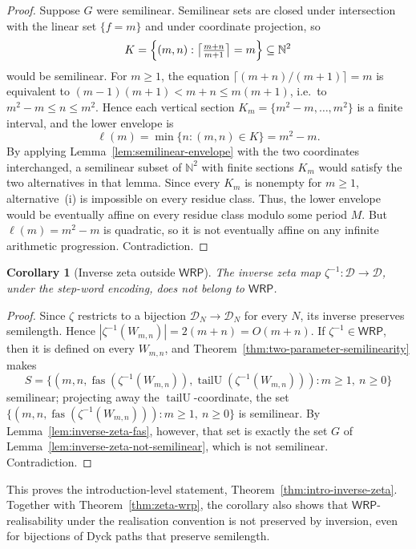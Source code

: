 \documentclass[11pt]{article}
\newtheorem{corollary}[theorem]{Corollary}
\theoremstyle{definition}
\newcommand{\D}{\mathcal D}
\newcommand{\N}{\mathbb N}
\newcommand{\WRP}{\mathsf{WRP}}
\newcommand{\fas}{\operatorname{fas}}
\newcommand{\tailU}{\operatorname{tailU}}
\begin{document}
\begin{proof}
Suppose $G$ were semilinear.  Semilinear sets are closed under intersection
with the linear set $\{f=m\}$ and under coordinate projection, so
\[
   K=\Bigl\{(m,n):\bigl\lceil\tfrac{m+n}{m+1}\bigr\rceil=m\Bigr\}\subseteq\N^2
\]
would be semilinear.  For $m\ge 1$, the equation
$\lceil (m+n)/(m+1)\rceil=m$ is equivalent to
$(m-1)(m+1)<m+n\le m(m+1)$, i.e.\ to $m^2-m\le n\le m^2$.  Hence each
vertical section $K_m=\{m^2-m,\ldots,m^2\}$ is a finite interval, and the
lower envelope is
\[
   \ell(m)=\min\{n:(m,n)\in K\}=m^2-m.
\]
By applying Lemma~\ref{lem:semilinear-envelope} with the two coordinates
interchanged, a semilinear subset of $\N^2$ with finite sections $K_m$ would
satisfy the two alternatives in that lemma.  Since every $K_m$ is nonempty for
$m\ge1$, alternative~(i) is impossible on every residue class.  Thus, the lower
envelope would be eventually affine on every residue class modulo some period
$M$.  But $\ell(m)=m^2-m$ is quadratic, so it is not eventually affine on any
infinite arithmetic progression.  Contradiction.
\end{proof}

\begin{corollary}[Inverse zeta outside $\WRP$]
\label{cor:inverse-zeta-not-wrp}
The inverse zeta map $\zeta^{-1}\colon\D\to\D$, under the step-word
encoding, does not belong to $\WRP$.
\end{corollary}

\begin{proof}
Since $\zeta$ restricts to a bijection $\D_N\to\D_N$ for every $N$, its inverse
preserves semilength.  Hence $|\zeta^{-1}(W_{m,n})|=2(m+n)=O(m+n)$.  If
$\zeta^{-1}\in\WRP$, then it is defined on every $W_{m,n}$, and
Theorem~\ref{thm:two-parameter-semilinearity} makes
\[
   S=\bigl\{(m,n,\fas(\zeta^{-1}(W_{m,n})),\tailU(\zeta^{-1}(W_{m,n}))):
              m\ge 1,\ n\ge 0\bigr\}
\]
semilinear; projecting away the $\tailU$-coordinate, the set
$\{(m,n,\fas(\zeta^{-1}(W_{m,n}))):m\ge1,\ n\ge0\}$ is semilinear.  By
Lemma~\ref{lem:inverse-zeta-fas}, however, that set is exactly the set $G$ of
Lemma~\ref{lem:inverse-zeta-not-semilinear}, which is not semilinear.
Contradiction.
\end{proof}

This proves the introduction-level statement,
Theorem~\ref{thm:intro-inverse-zeta}.
Together with Theorem~\ref{thm:zeta-wrp}, the corollary also shows that
$\WRP$-realisability under the realisation convention is not preserved by
inversion, even for bijections of Dyck paths that preserve semilength.
\end{document}
